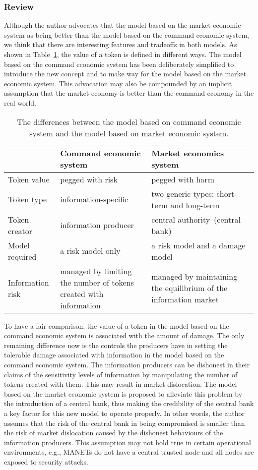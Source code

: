 \subsubsection{Review}
\label{sec:ebsreview}
Although the author advocates that the model based on the market economic
system as being better than the model based on the command economic
system, we think that there are interesting features and tradeoffs in
both models. As shown in Table~\ref{tbl:EBSComparison}, the value of a
token is defined in different ways. The model based on the command
economic system has been deliberately simplified to introduce the new
concept and to make way for the model based on the market economic
system. This advocation may also be compounded by an implicit
assumption that the market economy is better than the command economy
in the real world.
\begin{table}
\centering
\begin{tabular}{|p{}|p{}|p{}|}
  \hline
                   & Command economic system   & Market economics system\\
  \hline
  Token value      & pegged with risk          & pegged with harm\\
  \hline
  Token type       & information-specific      & two generic types: short-term and long-term\\
  \hline
  Token creator    & information producer      & central authority~(central bank)\\
  \hline
  Model required   & a risk model only         & a risk model and a damage model\\
  \hline
  Information risk & managed by limiting the number of tokens created with information & managed by maintaining the equilibrium of the information market\\
  \hline
\end{tabular}
\caption{The differences between the model based on command economic system and the model based on market economic system.}
\label{tbl:EBSComparison}
\end{table}

To have a fair comparison, the value of a token in the model based on
the command economic system is associated with the amount of
damage. The only remaining difference now is the controls the
producers have in setting the tolerable damage associated with
information in the model based on the command economic system. The
information producers can be dishonest in their claims of the
sensitivity levels of information by manipulating the number of tokens
created with them. This may result in market dislocation. The model
based on the market economic system is proposed to alleviate this
problem by the introduction of a central bank, thus making the
credibility of the central bank a key factor for this new model to
operate properly. In other words, the author assumes that the risk of
the central bank in being compromised is smaller than the risk of
market dislocation caused by the dishonest behaviours of the
information producers. This assumption may not hold true in certain
operational environments, e.g., MANETs do not have a central trusted
node and all nodes are exposed to security attacks.

